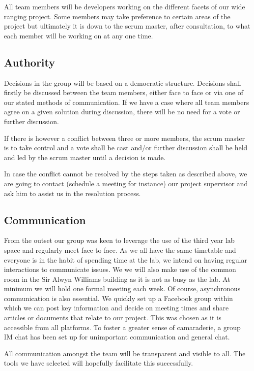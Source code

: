 \documentclass{l3proj}
\begin{document}
All team members will be developers working on the different facets of our wide ranging project. Some members may take preference to certain areas of the project but ultimately it is down to the scrum master, after consultation, to what each member will be working on at any one time.

\subsection{Authority}Decisions in the group will be based on a democratic structure. Decisions shall firstly be discussed between the team members, either face to face or via one of our stated methods of communication. If we have a case where all team members agree on a given solution during discussion, there will be no need for a vote or further discussion. 

If there is however a conflict between three or more members, the scrum master is to take control and a vote shall be cast and/or further discussion shall be held and led by the scrum master until a decision is made.

In case the conflict cannot be resolved by the steps taken as described above, we are going to contact (schedule a meeting for instance) our project supervisor and ask him to assist us in the resolution process.

\subsection{Communication}From the outset our group was keen to leverage the use of the third year lab space and regularly meet face to face. As we all have the same timetable and everyone is in the habit of spending time at the lab, we intend on having regular interactions to communicate issues. We we will also make use of the common room in the Sir Alwyn Williams building as it is not as busy as the lab. At minimum we will hold one formal meeting each week. Of course, asynchronous communication is also essential. We quickly set up a Facebook group within which we can post key information and decide on meeting times and share articles or documents that relate to our project. This was chosen as it is accessible from all platforms. To foster a greater sense of camaraderie, a group IM chat has been set up for unimportant communication and general chat.

All communication amongst the team will be transparent and visible to all. The tools we have selected will hopefully facilitate this successfully.
\end{document}
